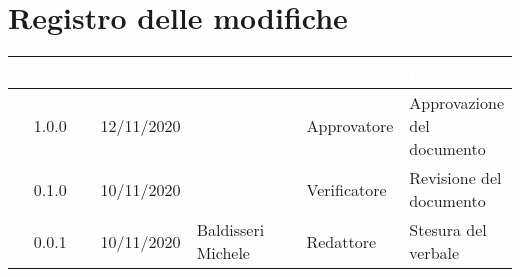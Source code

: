 \section*{Registro delle modifiche}
{
\renewcommand{\arraystretch}{1.5}
\centering
\begin{longtable}{c C{2.6cm}  C{2.6cm} C{2.6cm} C{3.5cm}}
\textcolor{white}{\textbf{Versione}}&
\textcolor{white}{\textbf{Data}}&
\textcolor{white}{\textbf{Nominativo}}&
\textcolor{white}{\textbf{Ruolo}}&
\textcolor{white}{\textbf{Descrizione}}\\	
\endhead
		
1.0.0 & 12/11/2020 & \SG{} & Approvatore & Approvazione del documento\\

0.1.0 & 10/11/2020 & \PA{} & Verificatore & Revisione del documento\\

0.0.1 & 10/11/2020 & Baldisseri Michele & Redattore & Stesura del verbale\\
		
\end{longtable}
}
